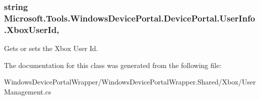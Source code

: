 \subsubsection[{\texorpdfstring{Xbox\+User\+Id}{XboxUserId}}]{\setlength{\rightskip}{0pt plus 5cm}string Microsoft.\+Tools.\+Windows\+Device\+Portal.\+Device\+Portal.\+User\+Info.\+Xbox\+User\+Id\hspace{0.3cm}{\ttfamily [get]}, {\ttfamily [set]}}\hypertarget{class_microsoft_1_1_tools_1_1_windows_device_portal_1_1_device_portal_1_1_user_info_a6544441b463329dfa493348f62746a95}{}\label{class_microsoft_1_1_tools_1_1_windows_device_portal_1_1_device_portal_1_1_user_info_a6544441b463329dfa493348f62746a95}


Gets or sets the Xbox User Id. 



The documentation for this class was generated from the following file\+:\begin{DoxyCompactItemize}
\item 
Windows\+Device\+Portal\+Wrapper/\+Windows\+Device\+Portal\+Wrapper.\+Shared/\+Xbox/User\+Management.\+cs\end{DoxyCompactItemize}
